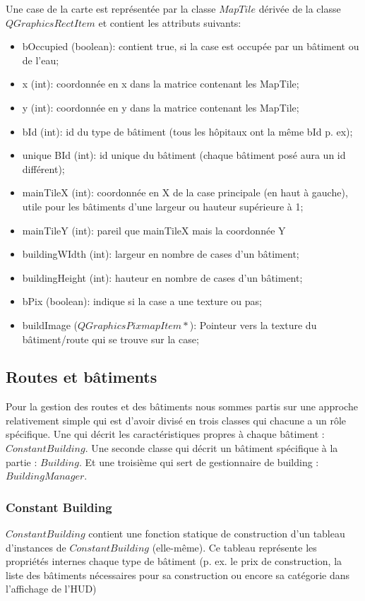 \documentclass[a4paper,10pt,openany,oneside]{report}
\begin{document}
Une case de la carte est représentée par la classe $MapTile$ dérivée de la classe $QGraphicsRectItem$ et contient les attributs suivants:
\begin{itemize}
\item bOccupied (boolean): contient true, si la case est occupée par un bâtiment ou de l'eau;
\item x (int): coordonnée en x dans la matrice contenant les MapTile;
\item y (int): coordonnée en y dans la matrice contenant les MapTile;
\item bId (int): id du type de bâtiment (tous les hôpitaux ont la même bId p. ex);
\item unique BId (int): id unique du bâtiment (chaque bâtiment posé aura un id différent);
\item mainTileX (int): coordonnée en X de la case principale (en haut à gauche), utile pour les bâtiments d'une largeur ou hauteur supérieure à 1;
\item mainTileY (int): pareil que mainTileX mais la coordonnée Y
\item buildingWIdth (int): largeur en nombre de cases d'un bâtiment;
\item buildingHeight (int): hauteur en nombre de cases d'un bâtiment;
\item bPix (boolean): indique si la case a une texture ou pas;
\item buildImage ($QGraphicsPixmapItem*$): Pointeur vers la texture du bâtiment/route qui se trouve sur la case;
\end{itemize}
\subsection{Routes et bâtiments}
Pour la gestion des routes et des bâtiments nous sommes partis sur une approche relativement simple qui est d'avoir divisé en trois classes qui chacune a un rôle spécifique. Une qui décrit les caractéristiques propres à chaque bâtiment : $ConstantBuilding$. Une seconde classe qui décrit un bâtiment spécifique à la partie : $Building$. Et une troisième qui sert de gestionnaire de building : $BuildingManager$. 

\subsubsection{Constant Building}
$ConstantBuilding$ contient une fonction statique de construction d'un tableau d'instances de $ConstantBuilding$ (elle-même). Ce tableau représente les propriétés internes chaque type de bâtiment (p. ex. le prix de construction, la liste des bâtiments nécessaires pour sa construction ou encore sa catégorie dans l'affichage de l'HUD)
\end{document}
